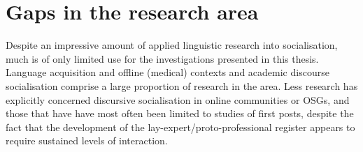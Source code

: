 

	  




   \section{Gaps in the research area}

	  Despite an impressive amount of applied linguistic research into socialisation, much is of only limited use for the investigations presented in this thesis. Language acquisition and offline (medical) contexts and academic discourse socialisation comprise a large proportion of research in the area. Less research has explicitly concerned discursive socialisation in online communities or OSGs, and those that have have most often been limited to studies of first posts, despite the fact that the development of the lay-expert/proto-professional register appears to require sustained levels of interaction.

